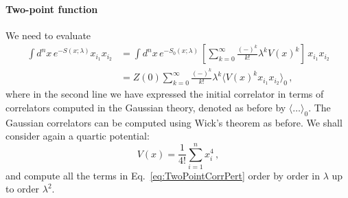\paragraph{Two-point function}

We need to evaluate
\begin{align}
  \int d^nx\, e^{-S(x;\lambda)} x_{i_1} x_{i_2} &= 
  \int d^nx\, e^{-S_0(x;\lambda)}\, \left[\sum_{k=0}^\infty
  \frac{(-)^k}{k!} \lambda^k V(x)^k \right]\, x_{i_1} x_{i_2} \\
  \label{eq:TwoPointCorrPert}
                                               &=Z(0) \sum_{k=0}^\infty
  \frac{(-)^k}{k!} \lambda^k \langle V(x)^k x_{i_1} x_{i_2}\rangle_0\, ,
\end{align}
where in the second line we have expressed the initial correlator in
terms of correlators computed in the Gaussian theory, denoted as
before by $\langle \ldots \rangle_0$. The Gaussian correlators can be
computed using Wick's theorem as before. We shall consider again a
quartic potential:
\begin{equation}
  V(x) = \frac{1}{4!} \sum_{i=1}^n x_i^4\, ,
\end{equation}
and compute all the terms in Eq.~\ref{eq:TwoPointCorrPert} order by
order in $\lambda$ up to order $\lambda^2$.
